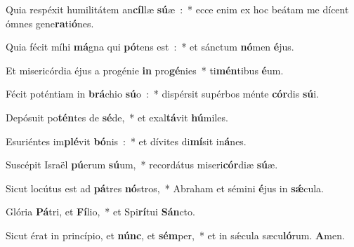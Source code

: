 ﻿\item Quia respéxit humilitátem an\textbf{cíl}\-læ \textbf{sú}\-æ~:~* ecce enim ex hoc beátam me dícent ómnes gene\textbf{ra}ti\textbf{ó}nes.
\item Quia fécit míhi \textbf{má}\-gna qui \textbf{pó}\-tens est~:~* et sánctum \textbf{nó}\-men \textbf{é}jus.
\item Et misericórdia éjus a progénie \textbf{in} pro\textbf{gé}\-nies~* ti\textbf{mén}\-tibus \textbf{é}um.
\item Fécit poténtiam in \textbf{brá}\-chio \textbf{sú}\-o~:~* dispérsit supérbos ménte \textbf{cór}\-dis \textbf{sú}i.
\item Depósuit po\textbf{tén}\-tes de \textbf{sé}\-de,~* et exal\textbf{tá}\-vit \textbf{hú}miles.
\item Esuriéntes im\textbf{plé}\-vit \textbf{bó}\-nis~:~* et dívites di\textbf{mí}\-sit in\textbf{á}nes.
\item Suscépit Israël \textbf{pú}\-erum \textbf{sú}\-um,~* recordátus miseri\textbf{cór}\-diæ \textbf{sú}æ.
\item Sicut locútus est ad \textbf{pá}\-tres \textbf{nó}\-stros,~* Abraham et sémini \textbf{é}\-jus in \textbf{sǽ}cula.
\item Glória \textbf{Pá}\-tri, et \textbf{Fí}\-lio,~* et Spi\textbf{rí}\-tui \textbf{Sán}cto.
\item Sicut érat in princípio, et \textbf{núnc}, et \textbf{sém}\-per,~* et in sǽcula sæcu\textbf{ló}\-rum. \textbf{A}men.
